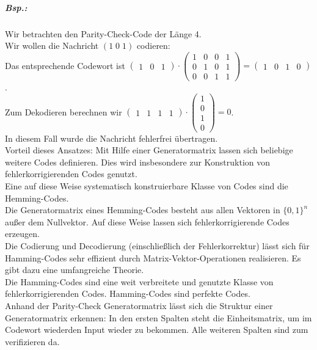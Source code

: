 \documentclass{scrreprt}
\begin{document}
\subparagraph{Bsp.:} Wir betrachten den Parity-Check-Code der Länge 4. \\
Wir wollen die Nachricht $(1\;0\;1)$ codieren:\\
Das entsprechende Codewort ist $\begin{pmatrix}
1 & 0 & 1
\end{pmatrix}\cdot \begin{pmatrix}
1 & 0 & 0 & 1\\
0 & 1 & 0 & 1 \\
0 & 0 & 1 & 1
\end{pmatrix}= \begin{pmatrix}
1 & 0 & 1 & 0
\end{pmatrix}$. \\
Zum Dekodieren berechnen wir $\begin{pmatrix}
1 & 1 & 1 & 1
\end{pmatrix}\cdot \begin{pmatrix}
1\\
0\\
1\\
0
\end{pmatrix}= 0$.\\
In diesem Fall wurde die Nachricht fehlerfrei übertragen.\bigskip\\
Vorteil dieses Ansatzes: Mit Hilfe einer Generatormatrix lassen sich beliebige weitere Codes definieren. Dies wird insbesondere zur Konstruktion von fehlerkorrigierenden Codes genutzt.\medskip\\
Eine auf diese Weise systematisch konstruierbare Klasse von Codes sind die Hemming-Codes.\\
Die Generatormatrix eines Hemming-Codes besteht aus allen Vektoren in $\{0,1\}^n$ außer dem Nullvektor. Auf diese Weise lassen sich fehlerkorrigierende Codes erzeugen.\\
Die Codierung und Decodierung (einschließlich der Fehlerkorrektur) lässt sich für Hamming-Codes sehr effizient durch Matrix-Vektor-Operationen realisieren. Es gibt dazu eine umfangreiche Theorie.\\
Die Hamming-Codes sind eine weit verbreitete und genutzte Klasse von fehlerkorrigierenden Codes. Hamming-Codes sind perfekte Codes.
\bigskip\\
Anhand der Parity-Check Generatormatrix lässt sich die Struktur einer Generatormatrix erkennen: In den ersten Spalten steht die Einheitsmatrix, um im Codewort wiederden Input wieder zu bekommen. Alle weiteren Spalten sind zum verifizieren da. \\
\end{document}
